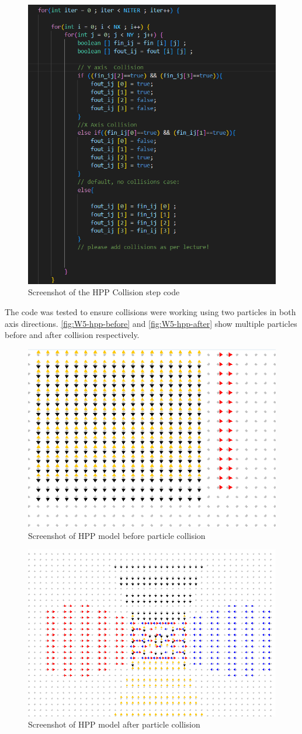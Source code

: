 \begin{figure}[H] 
    \centering
    \includegraphics[width=0.59\columnwidth]{Figures/Week 5/HPP Collision Step code.png}
    \caption{Screenshot of the HPP Collision step code}
    \label{fig:W5-collision-step-code}
\end{figure}

The code was tested to ensure collisions were working using two particles in both axis directions. \autoref{fig:W5-hpp-before} and \autoref{fig:W5-hpp-after} show multiple particles before and after collision respectively.
\begin{figure}[H] 
    \centering
    \includegraphics[width=0.49\columnwidth]{Figures/Week 5/HPP Mega Collision before.png}
    \caption{Screenshot of HPP model before particle collision}
    \label{fig:W5-hpp-before}
\end{figure}
\begin{figure}[H] 
    \centering
    \includegraphics[width=0.49\columnwidth]{Figures/Week 5/HPP Mega Collision After.png}
    \caption{Screenshot of HPP model after particle collision}
    \label{fig:W5-hpp-after}
\end{figure}


